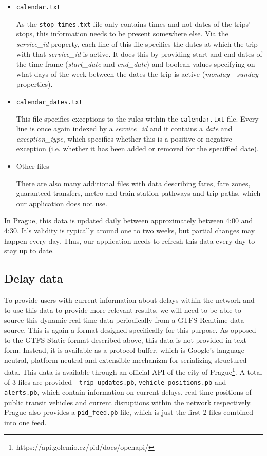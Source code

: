 \begin{itemize}
    \item \texttt{calendar.txt}

    As the \texttt{stop\_times.txt} file only contains times and not dates of the trips' stops, this information needs to be present somewhere else. Via the \textit{service\_id} property, each line of this file specifies the dates at which the trip with that \textit{service\_id} is active. It does this by providing start and end dates of the time frame (\textit{start\_date} and \textit{end\_date}) and boolean values specifying on what days of the week between the dates the trip is active (\textit{monday} - \textit{sunday} properties).

    \item \texttt{calendar\_dates.txt}

    This file specifies exceptions to the rules within the \texttt{calendar.txt} file. Every line is once again indexed by a \textit{service\_id} and it contains a \textit{date} and \textit{exception\_type}, which specifies whether this is a positive or negative exception (i.e. whether it has been added or removed for the speciffied date).

    \item Other files

    There are also many additional files with data describing fares, fare zones, guaranteed transfers, metro and train station pathways and trip paths, which our application does not use.
\end{itemize}

In Prague, this data is updated daily between approximately between 4:00 and 4:30\cite{pidopendata}. It's validity is typically around one to two weeks, but partial changes may happen every day. Thus, our application needs to refresh this data every day to stay up to date.

\subsection{Delay data}

To provide users with current information about delays within the network and to use this data to provide more relevant results, we will need to be able to source this dynamic real-time data periodically from a GTFS Realtime data source. This is again a format designed specifically for this purpose. As opposed to the GTFS Static format described above, this data is not provided in text form. Instead, it is available as a protocol buffer\cite{gtfs2024}, which is Google's language-neutral, platform-neutral and extensible mechanizm for serializing structured data\cite{protobuf2024}. This data is available through an official API of the city of Prague\footnote{https://api.golemio.cz/pid/docs/openapi/}. A total of 3 files are provided - \texttt{trip\_updates.pb}, \texttt{vehicle\_positions.pb} and \texttt{alerts.pb}, which contain information on current delays, real-time positions of public transit vehicles and current disruptions within the network respectively. Prague also provides a \texttt{pid\_feed.pb} file, which is just the first 2 files combined into one feed.

